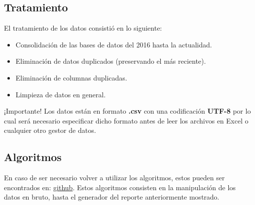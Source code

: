 \begin{itemize}
	\subsection{Tratamiento}
	El tratamiento de los datos consistió en lo siguiente:
	\begin{itemize}
		\item Consolidación de las bases de datos del 2016 hasta la actualidad. 
		\item Eliminación de datos duplicados (preservando el más reciente). 
		\item Eliminación de columnas duplicadas. 
		\item Limpieza de datos en general. 
	\end{itemize}

\begin{cajita}
	¡Importante! Los datos están en formato \textbf{.csv} con una codificación \textbf{UTF-8} por lo cual será necesario especificar dicho formato antes de leer los archivos en Excel o cualquier otro gestor de datos. 
\end{cajita}
\subsection{Algoritmos}
	En caso de ser necesario volver a utilizar los algoritmos, estos pueden ser encontrados en: 
	\href{https://github.com/RudiksChess/Dialogos_Algoritmos/tree/main/1.\%20PNC\%20limpieza\%20de\%20datos}{github}.  Estos algoritmos consisten en la manipulación de los datos en bruto, hasta el generador del reporte anteriormente mostrado. 
\end{itemize}






